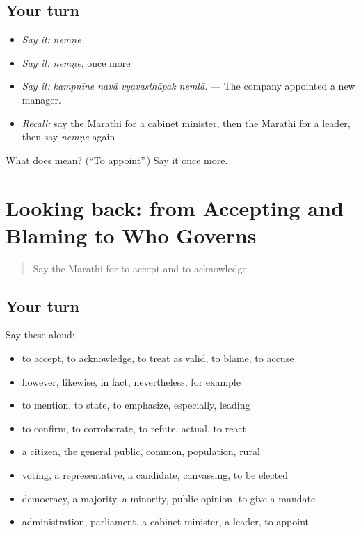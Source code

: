 \subsection*{Your turn}
\begin{itemize}
\raggedright
  \item \emph{Say it:} \emph{nemṇe}
  \item \emph{Say it:} \emph{nemṇe}, once more
  \item \emph{Say it:} \emph{kampnīne navā vyavasthāpak nemlā.} — The company appointed a new manager.
  \item \emph{Recall:} say the Marathi for a cabinet minister, then the Marathi for a leader, then say \emph{nemṇe} again
\end{itemize}

\begin{tcolorbox}[breakable,colback=teal!4,colframe=teal!35!black,title={Before you move on}]
What does  mean? (\textquotedblleft{}To appoint\textquotedblright{}.) Say it once more.
\end{tcolorbox}
\section[(dialogue)]{Looking back: from Accepting and Blaming to Who Governs}

\label{lesson:MR-R357-review-350-357}



\begin{quote}
Say the Marathi for to accept and to acknowledge.
\end{quote}

\subsection*{Your turn}
Say these aloud:

\begin{itemize}
\raggedright
  \item to accept, to acknowledge, to treat as valid, to blame, to accuse
  \item however, likewise, in fact, nevertheless, for example
  \item to mention, to state, to emphasize, especially, leading
  \item to confirm, to corroborate, to refute, actual, to react
  \item a citizen, the general public, common, population, rural
  \item voting, a representative, a candidate, canvassing, to be elected
  \item democracy, a majority, a minority, public opinion, to give a mandate
  \item administration, parliament, a cabinet minister, a leader, to appoint
\end{itemize}

